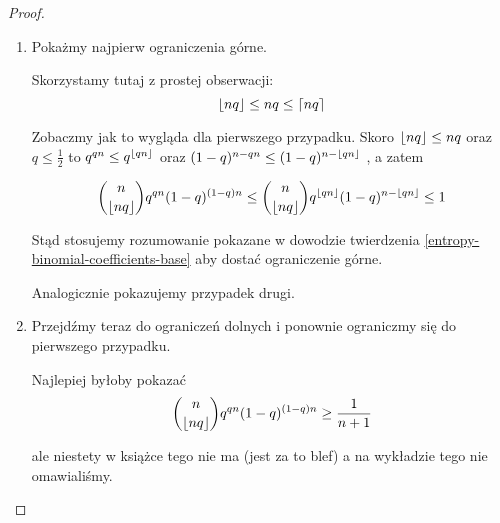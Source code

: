 \begin{proof}
    \begin{enumerate}
        \item Pokażmy najpierw ograniczenia górne.

    
        Skorzystamy tutaj z prostej obserwacji:
        \[
            \left\lfloor nq\right\rfloor \leq nq \leq \left\lceil nq\right\rceil
        \]
        
        Zobaczmy jak to wygląda dla pierwszego przypadku.
        Skoro \( \left\lfloor nq\right\rfloor \leq nq \) oraz \( q \leq \frac{1}{2} \) to 
        \( q^{qn} \leq q^{\left\lfloor qn\right\rfloor} \) 
        oraz 
        \( (1-q)^{n - qn} \leq (1-q)^{n - \left\lfloor qn\right\rfloor} \)
        , a zatem
        
        \[
            \binom{n}{\left\lfloor nq\right\rfloor} q^{qn}(1-q)^{(1-q)n} 
            \leq \binom{n}{\left\lfloor nq\right\rfloor} q^{\left\lfloor qn\right\rfloor}(1-q)^{n - \left\lfloor qn\right\rfloor} \leq 1
        \]
        
        Stąd stosujemy rozumowanie pokazane w dowodzie twierdzenia \ref{entropy-binomial-coefficients-base} aby dostać ograniczenie górne.
        
        Analogicznie pokazujemy przypadek drugi.
        
        
    \item Przejdźmy teraz do ograniczeń dolnych i ponownie ograniczmy się do pierwszego przypadku.
    
        Najlepiej byłoby pokazać
        \[
            \binom{n}{\left\lfloor nq\right\rfloor}q^{qn}(1-q)^{(1-q)n} \geq \frac{1}{n+1}
        \]
 
        ale niestety w książce tego nie ma (jest za to blef) a na wykładzie tego nie omawialiśmy.
    \end{enumerate}
\end{proof}